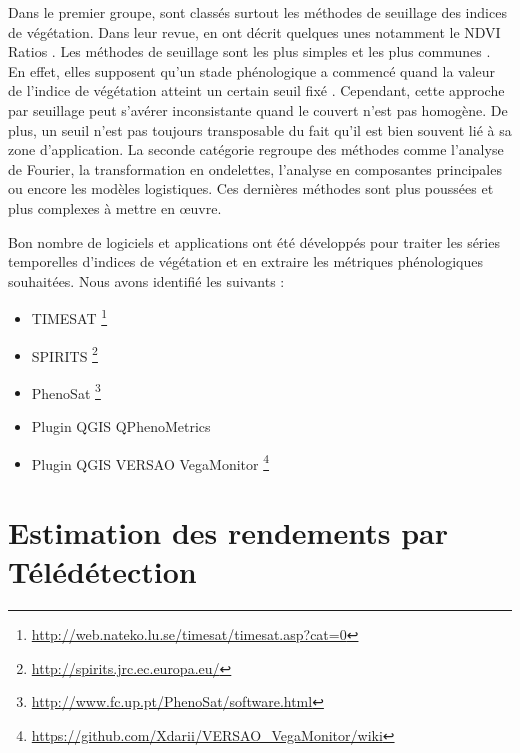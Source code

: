 Dans le premier groupe, sont classés surtout les méthodes de seuillage des indices de végétation. Dans leur revue, \citep{deBeurs2010} en ont décrit quelques unes notamment le NDVI 
Ratios \citep{White1997}. Les méthodes de seuillage sont les plus simples et les plus communes \citep{Pan2015}. En effet, elles supposent qu’un stade phénologique a commencé quand 
la valeur de l'indice de végétation atteint un certain seuil fixé \citep{Jonsson2002}. Cependant, cette approche par seuillage peut s'avérer inconsistante quand le couvert n'est 
pas homogène. De plus, un seuil n'est pas toujours transposable du fait qu'il est bien souvent lié à sa zone d'application. La seconde catégorie regroupe  des méthodes comme
l'analyse de Fourier, la transformation en ondelettes, l'analyse en composantes principales ou encore les modèles logistiques. Ces dernières méthodes sont plus poussées et plus 
complexes à mettre en \oe uvre. 

\vspace{5mm}

Bon nombre de logiciels et applications ont été développés pour traiter les séries temporelles d'indices de végétation et en extraire les métriques phénologiques souhaitées. 
Nous avons identifié les suivants :
\begin{itemize}
 \item TIMESAT \footnote{\url{http://web.nateko.lu.se/timesat/timesat.asp?cat=0}} \citep{Eklundh2017} 
 \item SPIRITS \footnote{\url{http://spirits.jrc.ec.europa.eu/}}
 \item PhenoSat \footnote{\url{http://www.fc.up.pt/PhenoSat/software.html}} \citep{Rodrigues2013}
 \item Plugin QGIS QPhenoMetrics \citep{Duarte2018}
 \item Plugin QGIS VERSAO VegaMonitor \footnote{\url{https://github.com/Xdarii/VERSAO_VegaMonitor/wiki}}
\end{itemize}

\section{Estimation des rendements par Télédétection}